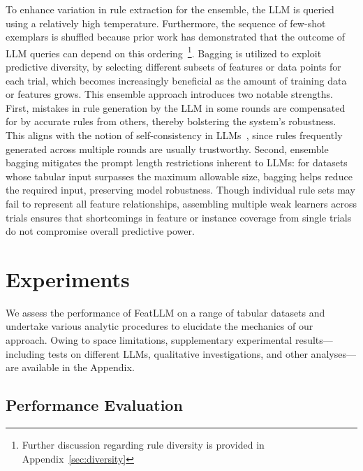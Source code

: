 To enhance variation in rule extraction for the ensemble, the LLM is queried using a relatively high temperature. Furthermore, the sequence of few-shot exemplars is shuffled because prior work has demonstrated that the outcome of LLM queries can depend on this ordering~\cite{lu2022fantastically}\footnote{Further discussion regarding rule diversity is provided in Appendix~\ref{sec:diversity}}. Bagging is utilized to exploit predictive diversity, by selecting different subsets of features or data points for each trial, which becomes increasingly beneficial as the amount of training data or features grows. This ensemble approach introduces two notable strengths. First, mistakes in rule generation by the LLM in some rounds are compensated for by accurate rules from others, thereby bolstering the system's robustness. This aligns with the notion of self-consistency in LLMs~\cite{wang2022self}, since rules frequently generated across multiple rounds are usually trustworthy. Second, ensemble bagging mitigates the prompt length restrictions inherent to LLMs: for datasets whose tabular input surpasses the maximum allowable size, bagging helps reduce the required input, preserving model robustness. Though individual rule sets may fail to represent all feature relationships, assembling multiple weak learners across trials ensures that shortcomings in feature or instance coverage from single trials do not compromise overall predictive power.

\section{Experiments}
We assess the performance of \textsf{FeatLLM} on a range of tabular datasets and undertake various analytic procedures to elucidate the mechanics of our approach. Owing to space limitations, supplementary experimental results—including tests on different LLMs, qualitative investigations, and other analyses—are available in the Appendix.

\subsection{Performance Evaluation}
